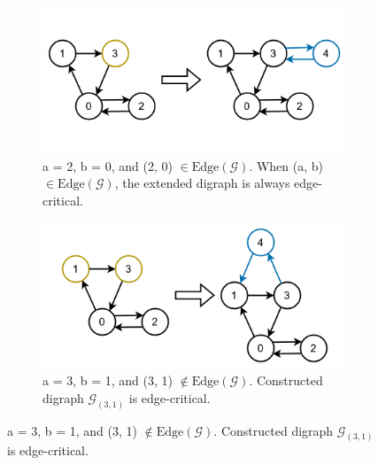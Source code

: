 \documentclass[runningheads]{llncs}
\begin{document}
\begin{figure}[htbp]
    \centering
    \begin{subfigure}{0.48\textwidth}
        \centering 
        \includegraphics[width=\textwidth]{fig1_a.png}
        \caption{a = 2, b = 0, and (2, 0) $\in \text{Edge}(\mathcal{G})$. When (a, b) $\in \text{Edge}(\mathcal{G})$, the extended digraph is always edge-critical.}
        \label{fig:1a}
    \end{subfigure}
    \hfill
    \begin{subfigure}{0.48\textwidth}
        \centering
        \includegraphics[width=\textwidth]{fig1_b.png}
        \caption{a = 3, b = 1, and (3, 1) $\notin \text{Edge}(\mathcal{G})$. Constructed digraph $\mathcal{G}_{(3, 1)}$ is edge-critical.}
        \label{fig:1b}
    \end{subfigure}
    
    \vspace{10pt}
    

\end{figure}
\end{document}
